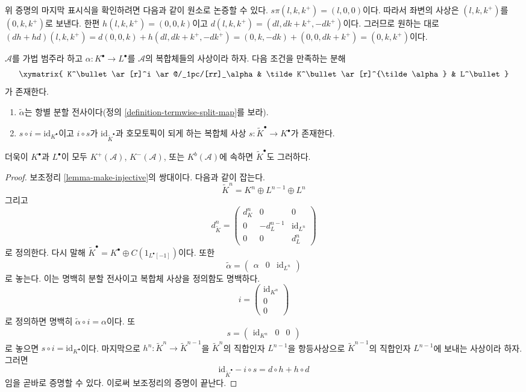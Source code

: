 \begin{remark}
\label{remark-compute-modules}
위 증명의 마지막 표시식을 확인하려면 다음과 같이 원소로 논증할 수
있다. $s\pi(l, k, k^{+}) = (l, 0, 0)$이다. 따라서 좌변의 사상은
$(l, k, k^{+})$를 $(0, k, k^{+})$로 보낸다. 한편
$h(l, k, k^{+}) = (0, 0, k)$이고
$d(l, k, k^{+}) = (dl, dk + k^{+}, -dk^{+})$이다. 그러므로 원하는 대로
$(dh + hd)(l, k, k^{+}) =
d(0, 0, k) + h(dl, dk + k^{+}, -dk^{+}) =
(0, k, -dk) + (0, 0, dk + k^{+}) = (0, k, k^{+})$이다.
\end{remark}

\begin{lemma}
\label{lemma-make-surjective}
$\mathcal{A}$를 가법 범주라 하고
$\alpha : K^\bullet \to L^\bullet$를 $\mathcal{A}$의 복합체들의
사상이라 하자. 다음 조건을 만족하는 분해
$$
\xymatrix{
K^\bullet \ar[r]^i \ar@/_1pc/[rr]_\alpha &
\tilde K^\bullet \ar[r]^{\tilde \alpha} &
L^\bullet
}
$$
가 존재한다.
\begin{enumerate}
\item $\tilde \alpha$는 항별 분할 전사이다(정의
\ref{definition-termwise-split-map}를 보라).
\item $s \circ i = \text{id}_{K^\bullet}$이고
$i \circ s$가 $\text{id}_{\tilde K^\bullet}$과 호모토픽이 되게 하는
복합체 사상 $s : \tilde K^\bullet \to K^\bullet$가 존재한다.
\end{enumerate}
더욱이 $K^\bullet$과 $L^\bullet$이 모두
$K^{+}(\mathcal{A})$, $K^{-}(\mathcal{A})$, 또는 $K^b(\mathcal{A})$에
속하면 $\tilde K^\bullet$도 그러하다.
\end{lemma}

\begin{proof}
보조정리 \ref{lemma-make-injective}의 쌍대이다. 다음과 같이 잡는다.
$$
\tilde K^n = K^n \oplus L^{n - 1} \oplus L^n
$$
그리고
$$
d^n_{\tilde K} =
\left(
\begin{matrix}
d^n_K & 0 & 0 \\
0 & - d^{n - 1}_L & \text{id}_{L^n} \\
0 & 0 & d^n_L
\end{matrix}
\right)
$$
로 정의한다. 다시 말해
$\tilde K^\bullet = K^\bullet \oplus C(1_{L^\bullet[-1]})$이다.
또한
$$
\tilde \alpha =
\left(
\begin{matrix}
\alpha &
0 &
\text{id}_{L^n}
\end{matrix}
\right)
$$
로 놓는다. 이는 명백히 분할 전사이고 복합체 사상을 정의함도
명백하다.
$$
i =
\left(
\begin{matrix}
\text{id}_{K^n} \\
0 \\
0
\end{matrix}
\right)
$$
로 정의하면 명백히 $\tilde \alpha \circ i = \alpha$이다. 또
$$
s =
\left(
\begin{matrix}
\text{id}_{K^n} &
0 &
0
\end{matrix}
\right)
$$
로 놓으면 $s \circ i = \text{id}_{K^\bullet}$이다.
마지막으로 $h^n : \tilde K^n \to \tilde K^{n - 1}$을
$\tilde K^n$의 직합인자 $L^{n - 1}$을 항등사상으로
$\tilde K^{n - 1}$의 직합인자 $L^{n - 1}$에 보내는 사상이라 하자.
그러면
$$
\text{id}_{\tilde K^\bullet} - i \circ s
=
d \circ h + h \circ d
$$
임을 곧바로 증명할 수 있다. 이로써 보조정리의 증명이 끝난다.
\end{proof}

